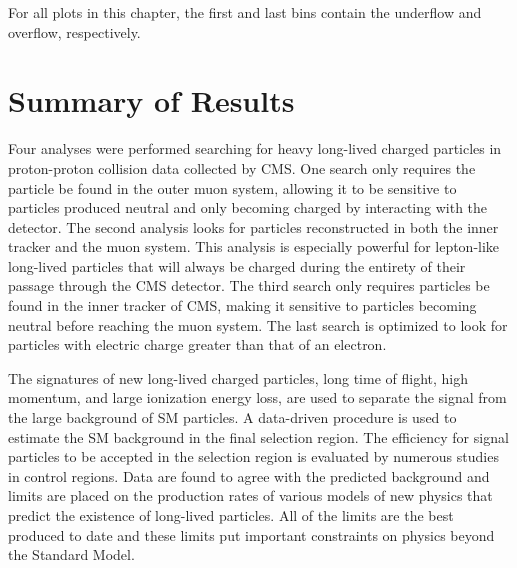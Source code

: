 For all plots in this chapter, the first and last bins contain the underflow and overflow, respectively.



















\section{Summary of Results}
Four analyses were performed searching for heavy long-lived charged particles in proton-proton collision data collected by CMS. One search only requires the particle be found
in the outer muon system, allowing it to be sensitive to particles produced neutral and only becoming charged by interacting with the detector. The second analysis looks
for particles reconstructed in both the inner tracker and the muon system. This analysis is especially powerful for lepton-like long-lived particles that will always be charged
during the entirety of their passage through the CMS detector. The third search only requires particles be found in the inner tracker of CMS, making it sensitive
to particles becoming neutral before reaching the muon system. The last search is optimized to look for particles with electric charge greater than that of
an electron.

The signatures of new long-lived charged particles, long time of flight, high momentum, and large ionization
energy loss, are used to separate the signal from the large background of SM particles.
A data-driven procedure is used to estimate the SM background in the final selection region. 
The efficiency for signal particles to be accepted in the selection region is evaluated by numerous studies in control regions.
Data are found to agree with the predicted background and limits are placed on the production rates of various models of new physics that predict
the existence of long-lived particles. All of the limits are the best produced to date and these limits put important constraints on physics beyond the Standard Model.